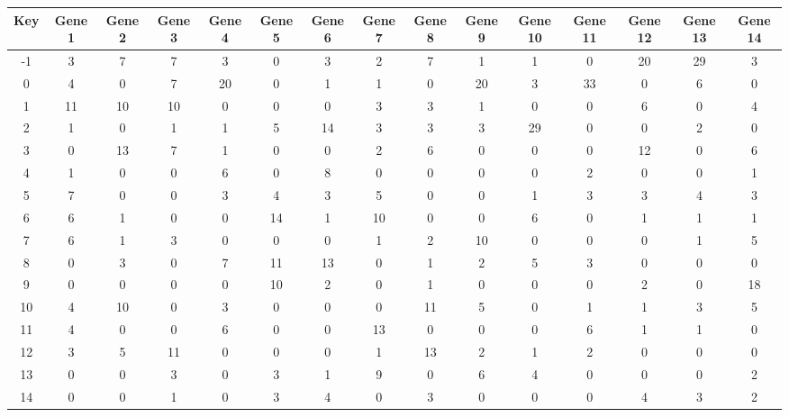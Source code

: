 \begin{tabular}{|c|c|c|c|c|c|c|c|c|c|c|c|c|c|c|}
\hline
Key & Gene 1 & Gene 2 & Gene 3 & Gene 4 & Gene 5 & Gene 6 & Gene 7 & Gene 8 & Gene 9 & Gene 10 & Gene 11 & Gene 12 & Gene 13 & Gene 14 \\
\hline
-1 & 3 & 7 & 7 & 3 & 0 & 3 & 2 & 7 & 1 & 1 & 0 & 20 & 29 & 3 \\
0 & 4 & 0 & 7 & 20 & 0 & 1 & 1 & 0 & 20 & 3 & 33 & 0 & 6 & 0 \\
1 & 11 & 10 & 10 & 0 & 0 & 0 & 3 & 3 & 1 & 0 & 0 & 6 & 0 & 4 \\
2 & 1 & 0 & 1 & 1 & 5 & 14 & 3 & 3 & 3 & 29 & 0 & 0 & 2 & 0 \\
3 & 0 & 13 & 7 & 1 & 0 & 0 & 2 & 6 & 0 & 0 & 0 & 12 & 0 & 6 \\
4 & 1 & 0 & 0 & 6 & 0 & 8 & 0 & 0 & 0 & 0 & 2 & 0 & 0 & 1 \\
5 & 7 & 0 & 0 & 3 & 4 & 3 & 5 & 0 & 0 & 1 & 3 & 3 & 4 & 3 \\
6 & 6 & 1 & 0 & 0 & 14 & 1 & 10 & 0 & 0 & 6 & 0 & 1 & 1 & 1 \\
7 & 6 & 1 & 3 & 0 & 0 & 0 & 1 & 2 & 10 & 0 & 0 & 0 & 1 & 5 \\
8 & 0 & 3 & 0 & 7 & 11 & 13 & 0 & 1 & 2 & 5 & 3 & 0 & 0 & 0 \\
9 & 0 & 0 & 0 & 0 & 10 & 2 & 0 & 1 & 0 & 0 & 0 & 2 & 0 & 18 \\
10 & 4 & 10 & 0 & 3 & 0 & 0 & 0 & 11 & 5 & 0 & 1 & 1 & 3 & 5 \\
11 & 4 & 0 & 0 & 6 & 0 & 0 & 13 & 0 & 0 & 0 & 6 & 1 & 1 & 0 \\
12 & 3 & 5 & 11 & 0 & 0 & 0 & 1 & 13 & 2 & 1 & 2 & 0 & 0 & 0 \\
13 & 0 & 0 & 3 & 0 & 3 & 1 & 9 & 0 & 6 & 4 & 0 & 0 & 0 & 2 \\
14 & 0 & 0 & 1 & 0 & 3 & 4 & 0 & 3 & 0 & 0 & 0 & 4 & 3 & 2 \\
\hline
\end{tabular}